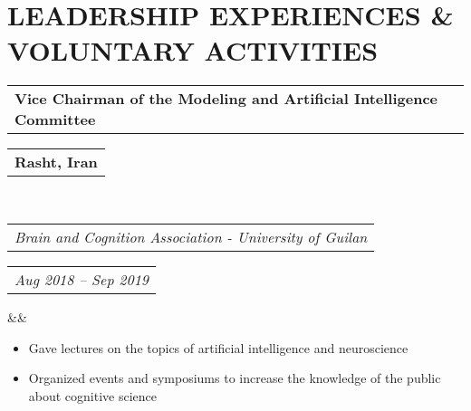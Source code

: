 \documentclass[11pt,a4paper,roman,colorlinks,linkcolor=blue,filecolor=magenta,urlcolor=cyan]{moderncv}        %
\makeatletter
\newcommand*{\customcventry}[7][.25em]{
  \begin{tabular}{@{}l} 
    {\bfseries #4}
  \end{tabular}
  \hfill%
  \begin{tabular}{l@{}}
     {\bfseries #5}
  \end{tabular} \\
  \begin{tabular}{@{}l} 
    {\itshape #3}
  \end{tabular}
  \hfill%
  \begin{tabular}{l@{}}
     {\itshape #2}
  \end{tabular}
  \ifx&#7&%
  \else{\\%
    \begin{minipage}{\maincolumnwidth}%
      \small#7%
    \end{minipage}}\fi%
  \par\addvspace{#1}}
\newcommand*{\customcvproject}[4][.25em]{
  \begin{tabular}{@{}l} 
    {\bfseries #2}
  \end{tabular}
  \hfill%
  \begin{tabular}{l@{}}
     { #3}
  \end{tabular}
  \ifx&#4&%
  \else{\\%
    \begin{minipage}{\maincolumnwidth}%
      \small#4%
    \end{minipage}}\fi%
  \par\addvspace{#1}}
\makeatother
\begin{document}




\section{LEADERSHIP EXPERIENCES \& VOLUNTARY ACTIVITIES}
    		{\customcventry{Aug 2018 -- Sep 2019}{Brain and Cognition Association - University of Guilan}{Vice Chairman of the Modeling and Artificial Intelligence Committee}{Rasht, Iran}{}{}}
    		\begin{itemize}
    		    \item Gave lectures on the topics of artificial intelligence and neuroscience
    		    \item Organized events and symposiums to increase the knowledge of the public about cognitive science
    		\end{itemize}
		
\end{document}
